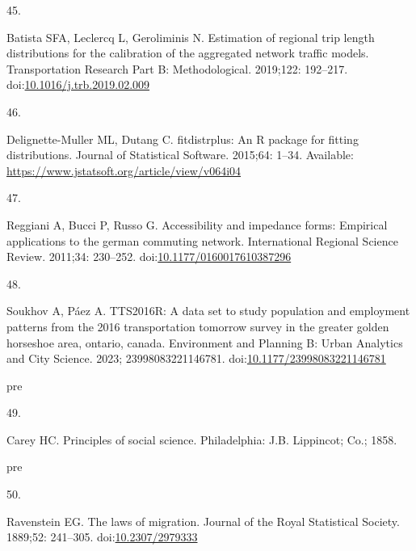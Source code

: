\documentclass[10pt,letterpaper]{article}
\newlength{\cslhangindent}
\newlength{\csllabelwidth}
\newlength{\cslentryspacingunit} %
\newenvironment{CSLReferences}[2] %
 {%
  \setlength{\parindent}{0pt}
  \ifodd #1
  \let\oldpar\par
  \def\par{\hangindent=\cslhangindent\oldpar}
  \fi
  \setlength{\parskip}{#2\cslentryspacingunit}
 }%
 {}
\newcommand{\CSLLeftMargin}[1]{\parbox[t]{\csllabelwidth}{#1}}
\newcommand{\CSLRightInline}[1]{\parbox[t]{\linewidth - \csllabelwidth}{#1}\break}
\providecommand{\DIFaddtex}[1]{{\protect\color{blue}\uwave{#1}}} %
\providecommand{\DIFaddbegin}{} %
\providecommand{\DIFaddend}{} %
\providecommand{\DIFdelbegin}{} %
\providecommand{\DIFdelend}{} %
\providecommand{\DIFadd}[1]{\texorpdfstring{\DIFaddtex{#1}}{#1}} %
\newcommand{\DIFscaledelfig}{0.5}
\newlength{\DIFdelgraphicswidth} %
\newlength{\DIFdelgraphicsheight} %
\newcommand{\DIFaddincludegraphics}[2][]{{\color{blue}\fbox{\DIFOincludegraphics[#1]{#2}}}} %
\newcommand{\DIFdelincludegraphics}[2][]{%
\sbox{\DIFdelgraphicsbox}{\DIFOincludegraphics[#1]{#2}}%
\settoboxwidth{\DIFdelgraphicswidth}{\DIFdelgraphicsbox} %
\settoboxtotalheight{\DIFdelgraphicsheight}{\DIFdelgraphicsbox} %
\scalebox{\DIFscaledelfig}{%
\parbox[b]{\DIFdelgraphicswidth}{\usebox{\DIFdelgraphicsbox}\\[-\baselineskip] \rule{\DIFdelgraphicswidth}{0em}}\llap{\resizebox{\DIFdelgraphicswidth}{\DIFdelgraphicsheight}{%
\setlength{\unitlength}{\DIFdelgraphicswidth}%
\begin{picture}(1,1)%
\thicklines\linethickness{2pt} %
{\color[rgb]{1,0,0}\put(0,0){\framebox(1,1){}}}%
{\color[rgb]{1,0,0}\put(0,0){\line( 1,1){1}}}%
{\color[rgb]{1,0,0}\put(0,1){\line(1,-1){1}}}%
\end{picture}%
}\hspace*{3pt}}} %
} %
\DeclareRobustCommand{\DIFaddbegin}{\DIFOaddbegin \let\includegraphics\DIFaddincludegraphics} %
\DeclareRobustCommand{\DIFaddend}{\DIFOaddend \let\includegraphics\DIFOincludegraphics} %
\DeclareRobustCommand{\DIFdelbegin}{\DIFOdelbegin \let\includegraphics\DIFdelincludegraphics} %
\DeclareRobustCommand{\DIFdelend}{\DIFOaddend \let\includegraphics\DIFOincludegraphics} %
\begin{document}
\begin{CSLReferences}{0}{0}
\leavevmode{}%
\DIFdelbegin %
\DIFdelend \DIFaddbegin \CSLLeftMargin{45. }\DIFaddend %
\CSLRightInline{Batista SFA, Leclercq L, Geroliminis N. Estimation of
regional trip length distributions for the calibration of the aggregated
network traffic models. Transportation Research Part B: Methodological.
2019;122: 192--217.
doi:\href{https://doi.org/10.1016/j.trb.2019.02.009}{10.1016/j.trb.2019.02.009}}

\leavevmode{}%
\DIFdelbegin %
\DIFdelend \DIFaddbegin \CSLLeftMargin{46. }\DIFaddend %
\CSLRightInline{Delignette-Muller ML, Dutang C. {fitdistrplus}: An {R}
package for fitting distributions. Journal of Statistical Software.
2015;64: 1--34. Available:
\url{https://www.jstatsoft.org/article/view/v064i04}}

\leavevmode{}%
\DIFdelbegin %
\DIFdelend \DIFaddbegin \CSLLeftMargin{47. }\DIFaddend %
\CSLRightInline{Reggiani A, Bucci P, Russo G. Accessibility and
impedance forms: Empirical applications to the german commuting network.
International Regional Science Review. 2011;34: 230--252.
doi:\href{https://doi.org/10.1177/0160017610387296}{10.1177/0160017610387296}}

\leavevmode{}%
\DIFdelbegin %
\DIFdelend \DIFaddbegin \CSLLeftMargin{48. }\DIFaddend %
\CSLRightInline{Soukhov A, Páez A. {TTS}2016R: A data set to study
population and employment patterns from the 2016 transportation tomorrow
survey in the greater golden horseshoe area, ontario, canada.
Environment and Planning B: Urban Analytics and City Science. 2023;
23998083221146781.
doi:\href{https://doi.org/10.1177/23998083221146781}{10.1177/23998083221146781}}
\DIFaddbegin 

\leavevmode\vadjust \DIFadd{pre}{\hypertarget{ref-careyPriciples1858}{}}%
\CSLLeftMargin{49. }%
\CSLRightInline{Carey HC. Principles of social science. Philadelphia:
J.B. Lippincot; Co.; 1858. }

\leavevmode\vadjust \DIFadd{pre}{\hypertarget{ref-ravensteinLaws1889}{}}%
\CSLLeftMargin{50. }%
\CSLRightInline{Ravenstein EG. The laws of migration. Journal of the
Royal Statistical Society. 1889;52: 241--305.
doi:\href{https://doi.org/10.2307/2979333}{10.2307/2979333}}


\end{CSLReferences}
\end{document}
